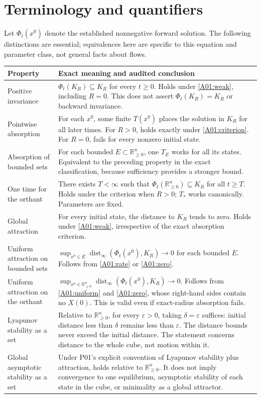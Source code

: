 \documentclass[11pt]{article}
\newcommand{\RR}{\mathbb R}
\newcommand{\Orth}{\RR_{\geq0}^{n}}
\newcommand{\dist}{\operatorname{dist}_{\infty}}
\begin{document}
\section{Terminology and quantifiers}
Let $\Phi_t(x^0)$ denote the established nonnegative forward solution.
The following distinctions are essential; equivalences here are specific
to this equation and parameter class, not general facts about flows.

\begin{longtable}{@{}P{0.24\textwidth}P{0.71\textwidth}@{}}
\toprule
Property & Exact meaning and audited conclusion \\
\midrule\endhead
Positive invariance & $\Phi_t(K_R)\subseteq K_R$ for every $t\geq0$.
Holds under \eqref{A01:weak}, including $R=0$. This does not assert
$\Phi_t(K_R)=K_R$ or backward invariance. \\
Pointwise absorption & For each $x^0$, some finite $T(x^0)$ places the
solution in $K_R$ for all later times. For $R>0$, holds exactly under
\eqref{A01:criterion}. For $R=0$, fails for every nonzero initial state. \\
Absorption of bounded sets & For each bounded $E\subset\Orth$, one
$T_E$ works for all its states. Equivalent to the preceding property
in the exact classification, because sufficiency provides a stronger bound. \\
One time for the orthant & There exists $T<\infty$ such that
$\Phi_t(\Orth)\subseteq K_R$ for all $t\geq T$. Holds under the criterion
when $R>0$; $T_*$ works canonically. Parameters are fixed. \\
Global attraction & For every initial state, the distance to $K_R$
tends to zero. Holds under \eqref{A01:weak}, irrespective of the exact
absorption criterion. \\
Uniform attraction on bounded sets &
$\sup_{x^0\in E}\dist(\Phi_t(x^0),K_R)\to0$ for each bounded $E$.
Follows from \eqref{A01:rate} or \eqref{A01:zero}. \\
Uniform attraction on the orthant &
$\sup_{x^0\in\Orth}\dist(\Phi_t(x^0),K_R)\to0$.
Follows from \eqref{A01:uniform} and \eqref{A01:zero}, whose right-hand
sides contain no $X(0)$. This is valid even if exact-radius absorption fails. \\
Lyapunov stability as a set & Relative to $\Orth$, for every
$\varepsilon>0$, taking $\delta=\varepsilon$ suffices: initial distance
less than $\delta$ remains less than $\varepsilon$. The distance bounds
never exceed the initial distance. The statement concerns distance to
the whole cube, not motion within it. \\
Global asymptotic stability as a set & Under P01's explicit convention
of Lyapunov stability plus attraction, holds relative to $\Orth$.
It does not imply convergence to one equilibrium, asymptotic stability
of each state in the cube, or minimality as a global attractor. \\
\bottomrule
\end{longtable}
\end{document}
